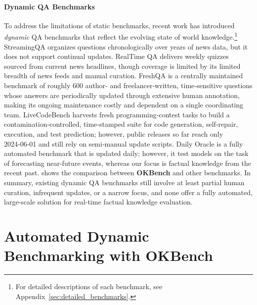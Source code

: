 \documentclass[11pt]{article}
\newcommand{\name}{{\textbf{OKBench}}}
\begin{document}
\paragraph{Dynamic QA Benchmarks}
To address the limitations of static benchmarks, recent work has introduced \emph{dynamic} QA benchmarks that reflect the evolving state of world knowledge.\footnote{For detailed descriptions of each benchmark, see Appendix~\ref{sec:detailed_benchmarks}.}
StreamingQA \citep{liška2022streamingqabenchmarkadaptationnew} organizes questions chronologically over years of news data, but it does not support continual updates. RealTime QA \citep{kasai2024realtimeqawhatsanswer} delivers weekly quizzes sourced from current news headlines, though coverage is limited by its limited breadth of news feeds and manual curation. FreshQA \citep{vu-etal-2024-freshllms} is a centrally maintained benchmark of roughly 600 author‑ and freelancer‑written, time‑sensitive questions whose answers are periodically updated through extensive human annotation, making its ongoing maintenance costly and dependent on a single coordinating team. 
LiveCodeBench \citep{jain2024livecodebenchholisticcontaminationfree} harvests fresh programming‑contest tasks to build a contamination‑controlled, time‑stamped suite for code generation, self‑repair, execution, and test prediction; however, public releases so far reach only 2024‑06‑01 and still rely on semi‑manual update scripts. Daily Oracle \citep{dai2024llmsprescientcontinuousevaluation} is a fully automated benchmark that is updated daily; however, it %
test models on the task of forecasting near-future events, whereas our focus is factual knowledge from the recent past.
 shows the comparison between \name{} and other benchmarks. 
In summary, existing dynamic QA benchmarks still involve at least partial human curation, infrequent updates, or a narrow focus, and none offer a fully automated, large-scale solution for real-time factual knowledge evaluation. 




\section{Automated Dynamic Benchmarking with \name}
\end{document}
